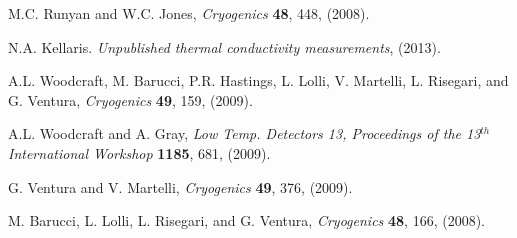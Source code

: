 \documentclass[final]{svjour2}
\begin{document}
\begin{thebibliography}{99}

M.C. Runyan and W.C. Jones, {\it Cryogenics} \textbf{48}, 448, (2008).

N.A. Kellaris. {\it Unpublished thermal conductivity measurements}, (2013).

A.L. Woodcraft, M. Barucci, P.R. Hastings, L. Lolli, V. Martelli, L. Risegari, and G. Ventura, {\it Cryogenics} \textbf{49}, 159, (2009).

A.L. Woodcraft and A. Gray, {\it Low Temp. Detectors 13, Proceedings of the 13$^{th}$ International Workshop} \textbf{1185}, 681, (2009).

G. Ventura and V. Martelli, {\it Cryogenics} \textbf{49}, 376, (2009).

M. Barucci, L. Lolli, L. Risegari, and G. Ventura, {\it Cryogenics} \textbf{48}, 166, (2008).

\end{thebibliography}
\end{document}
